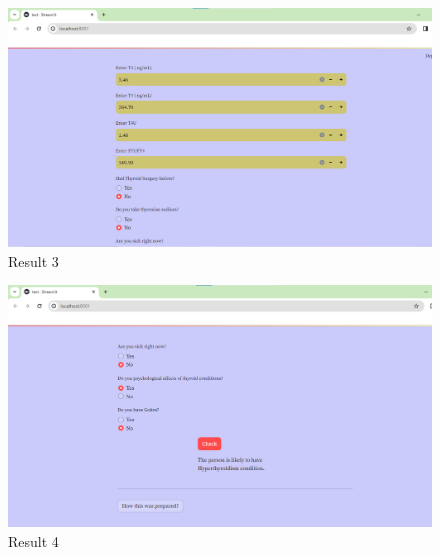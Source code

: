 \begin{figure}[h]
\centering
\includegraphics[scale=0.4]{result3.png}
\caption{Result 3}
\end{figure}

\begin{figure}[ht]
\centering
\includegraphics[scale=0.4]{result4.png}
\caption{Result 4}
\end{figure}



